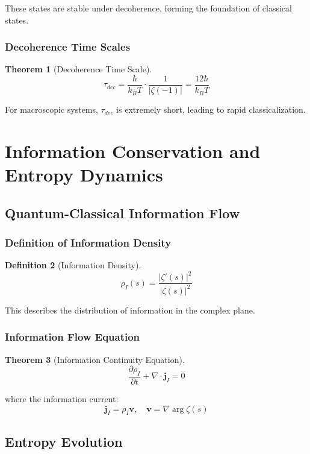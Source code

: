 \documentclass[11pt]{article}
\theoremstyle{plain}
\newtheorem{theorem}{Theorem}[section]
\theoremstyle{definition}
\newtheorem{definition}[theorem]{Definition}
\theoremstyle{remark}
\begin{document}
These states are stable under decoherence, forming the foundation of classical states.

\subsubsection{Decoherence Time Scales}

\begin{theorem}[Decoherence Time Scale]
$$\tau_{dec} = \frac{\hbar}{k_B T} \cdot \frac{1}{|\zeta(-1)|} = \frac{12\hbar}{k_B T}$$
\end{theorem}

For macroscopic systems, $\tau_{dec}$ is extremely short, leading to rapid classicalization.

\section{Information Conservation and Entropy Dynamics}

\subsection{Quantum-Classical Information Flow}

\subsubsection{Definition of Information Density}

\begin{definition}[Information Density]
$$\rho_I(s) = \frac{|\zeta'(s)|^2}{|\zeta(s)|^2}$$
\end{definition}

This describes the distribution of information in the complex plane.

\subsubsection{Information Flow Equation}

\begin{theorem}[Information Continuity Equation]
$$\frac{\partial \rho_I}{\partial t} + \nabla \cdot \mathbf{j}_I = 0$$
\end{theorem}

where the information current:
$$\mathbf{j}_I = \rho_I \mathbf{v}, \quad \mathbf{v} = \nabla \arg \zeta(s)$$

\subsection{Entropy Evolution}
\end{document}
